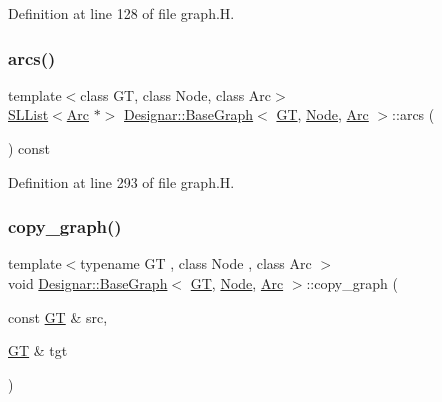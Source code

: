 Definition at line 128 of file graph.\+H.

\mbox{\label{class_designar_1_1_base_graph_af9d306a0474e8e3b38b7bd697b844d11}} 
\subsubsection{\texorpdfstring{arcs()}{arcs()}}
{\footnotesize\ttfamily template$<$class GT, class Node, class Arc$>$ \\
\hyperlink{class_designar_1_1_s_l_list}{S\+L\+List}$<$\hyperlink{namespace_designar_a3f55fb5513d62ff47cbc8f72b8e95d6f}{Arc} $\ast$$>$ \hyperlink{class_designar_1_1_base_graph}{Designar\+::\+Base\+Graph}$<$ \hyperlink{demo-buildgraph_8_c_a3001c40d2c31ca87ed96cd7d1334a55e}{GT}, \hyperlink{namespace_designar_a5af326c65aa2bd26b26c410f2030d09e}{Node}, \hyperlink{namespace_designar_a3f55fb5513d62ff47cbc8f72b8e95d6f}{Arc} $>$\+::arcs (\begin{DoxyParamCaption}{ }\end{DoxyParamCaption}) const\hspace{0.3cm}{\ttfamily [inline]}}



Definition at line 293 of file graph.\+H.

\mbox{\label{class_designar_1_1_base_graph_ac34a3b513973c2ed43067934f71ace28}} 
\subsubsection{\texorpdfstring{copy\+\_\+graph()}{copy\_graph()}}
{\footnotesize\ttfamily template$<$typename GT , class Node , class Arc $>$ \\
void \hyperlink{class_designar_1_1_base_graph}{Designar\+::\+Base\+Graph}$<$ \hyperlink{demo-buildgraph_8_c_a3001c40d2c31ca87ed96cd7d1334a55e}{GT}, \hyperlink{namespace_designar_a5af326c65aa2bd26b26c410f2030d09e}{Node}, \hyperlink{namespace_designar_a3f55fb5513d62ff47cbc8f72b8e95d6f}{Arc} $>$\+::copy\+\_\+graph (\begin{DoxyParamCaption}\item[{const \hyperlink{demo-buildgraph_8_c_a3001c40d2c31ca87ed96cd7d1334a55e}{GT} \&}]{src,  }\item[{\hyperlink{demo-buildgraph_8_c_a3001c40d2c31ca87ed96cd7d1334a55e}{GT} \&}]{tgt }\end{DoxyParamCaption})\hspace{0.3cm}{\ttfamily [static]}}



